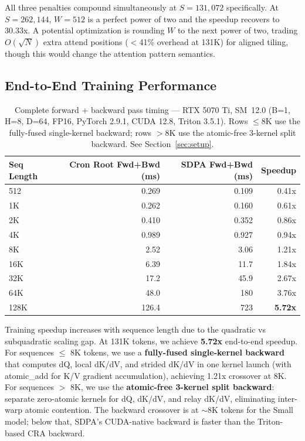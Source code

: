 \documentclass{article}
\begin{document}
    All three penalties compound simultaneously at $S=131{,}072$ specifically. At $S=262{,}144$, $W=512$ is a perfect power of two and the speedup recovers to 30.33x. A potential optimization is rounding $W$ to the next power of two, trading $O(\sqrt{N})$ extra attend positions ($<$41\% overhead at 131K) for aligned tiling, though this would change the attention pattern semantics.

    \subsection{End-to-End Training Performance}

    \begin{table}[h]
    \centering
    \caption{Complete forward + backward pass timing — RTX 5070 Ti, SM~12.0 (B=1, H=8, D=64, FP16, PyTorch 2.9.1, CUDA 12.8, Triton 3.5.1). Rows $\leq$8K use the fully-fused single-kernel backward; rows $>$8K use the atomic-free 3-kernel split backward. See Section~\ref{sec:setup}.}
    \begin{tabular}{lrrr}
    \toprule
    Seq Length & Cron Root Fwd+Bwd (ms) & SDPA Fwd+Bwd (ms) & Speedup \\
    \midrule
    512 & 0.269 & 0.109 & 0.41x \\
    1K & 0.262 & 0.160 & 0.61x \\
    2K & 0.410 & 0.352 & 0.86x \\
    4K & 0.989 & 0.927 & 0.94x \\
    8K & 2.52 & 3.06 & 1.21x \\
    16K & 6.39 & 11.7 & 1.84x \\
    32K & 17.2 & 45.9 & 2.67x \\
    64K & 48.0 & 180 & 3.76x \\
    128K & 126.4 & 723 & \textbf{5.72x} \\
    \bottomrule
    \end{tabular}
    \label{tab:training}
    \end{table}

    Training speedup increases with sequence length due to the quadratic vs subquadratic scaling gap. At 131K tokens, we achieve \textbf{5.72x} end-to-end speedup. For sequences $\leq$ 8K tokens, we use a \textbf{fully-fused single-kernel backward} that computes dQ, local dK/dV, and strided dK/dV in one kernel launch (with atomic\_add for K/V gradient accumulation), achieving 1.21x crossover at 8K. For sequences $>$ 8K, we use the \textbf{atomic-free 3-kernel split backward}: separate zero-atomic kernels for dQ, dK/dV, and relay dK/dV, eliminating inter-warp atomic contention. The backward crossover is at $\sim$8K tokens for the Small model; below that, SDPA's CUDA-native backward is faster than the Triton-based CRA backward.
\end{document}
